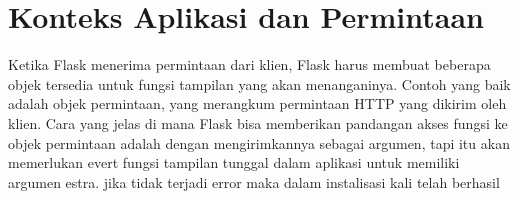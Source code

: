 \section{Konteks Aplikasi dan Permintaan}
Ketika Flask menerima permintaan dari klien, Flask harus membuat beberapa objek tersedia untuk fungsi tampilan yang akan menanganinya. Contoh yang baik adalah objek permintaan, yang merangkum permintaan HTTP yang dikirim oleh klien. Cara yang jelas di mana Flask bisa memberikan pandangan akses fungsi ke objek permintaan adalah dengan mengirimkannya sebagai argumen, tapi itu akan memerlukan evert fungsi tampilan tunggal dalam aplikasi untuk memiliki argumen estra.
jika tidak terjadi error maka dalam instalisasi kali telah berhasil



